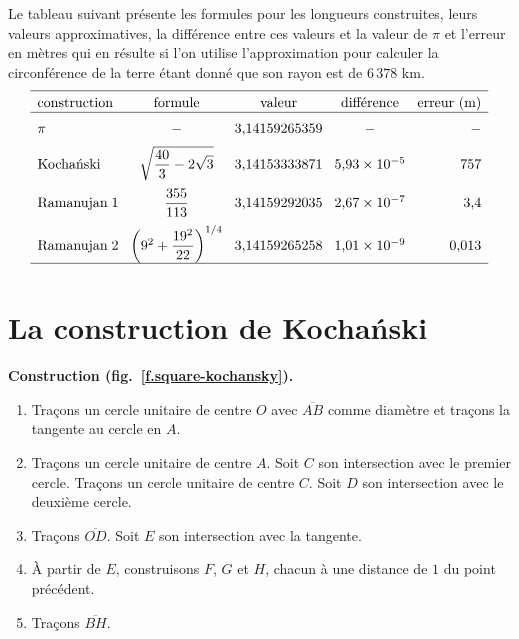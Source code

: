 Le tableau suivant présente les formules pour les longueurs construites, leurs valeurs approximatives, la différence entre ces valeurs et la valeur de $\pi$ et l'erreur en mètres qui en résulte si l'on utilise l'approximation pour calculer la circonférence de la terre étant donné que son rayon est de $6\,378$ km.
\[
\begin{array}{l@{\hspace{3mm}}c@{\hspace{3mm}}c@{\hspace{3mm}}c@{\hspace{3mm}}r}
\hline\noalign{\smallskip}
\textrm{construction} & \textrm{formule} &\textrm{valeur} & \textrm{différence} & \textrm{erreur (m)}\\\hline\noalign{\medskip}
\pi & -& \mbox{3,14159265359} & - & -\\\noalign{\medskip}
\textrm{Kocha\'{n}ski} & \sqrt{\displaystyle\frac{40}{3}-2\sqrt{3}}&
  \mbox{3,14153333871} & \mbox{5,93} \times 10^{-5} & 757\\\noalign{\medskip}
\textrm{Ramanujan}\; 1 & \displaystyle\frac{355}{113} &
  \mbox{3,14159292035} &\mbox{2,67}  \times 10^{-7}&\mbox{3,4}\\\noalign{\medskip}
\textrm{Ramanujan}\; 2 &\left(9^2+\displaystyle\frac{19^2}{22}\right)^{1/4}&
  \mbox{3,14159265258} & \mbox{1,01} \times 10^{-9}& \mbox{0,013}\\
\hline\noalign{\smallskip}
\end{array}
\]


\section{La construction de Kocha\'{n}ski }\label{s.square-kochanski}

\textbf{Construction (fig.~\ref{f.square-kochansky}).}
\begin{enumerate}
\item Traçons un cercle unitaire de centre  $O$ avec $\overline{AB}$ comme diamètre et traçons la tangente au cercle en $A$.
\item Traçons un cercle unitaire de centre  $A$. Soit $C$ son intersection avec le premier cercle. Traçons un cercle unitaire de centre  $C$. Soit $D$ son intersection avec le deuxième cercle. 
\item Traçons $\overline{OD}$. Soit $E$ son intersection avec la tangente.
\item \`A partir de $E$, construisons  $F$, $G$ et $H$, chacun à une distance de $1$ du point précédent.
\item Traçons $\overline{BH}$.
\end{enumerate}

